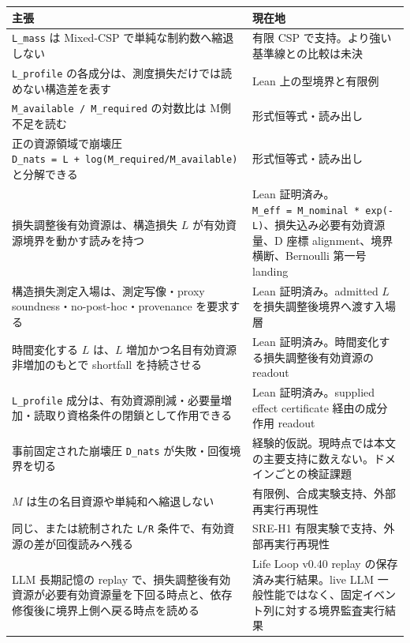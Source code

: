 \documentclass[12pt,a4paper]{article}
\begin{document}
{\def\LTcaptype{table} %
\begin{longtable}[]{@{}
  >{\raggedright\arraybackslash}p{}
  >{\raggedright\arraybackslash}p{}@{}}
\toprule\noalign{}
\begin{minipage}[b]{\linewidth}\raggedright
主張
\end{minipage} & \begin{minipage}[b]{\linewidth}\raggedright
現在地
\end{minipage} \\
\midrule\noalign{}
\endhead
\bottomrule\noalign{}
\endlastfoot
\texttt{L\_mass} は Mixed-CSP で単純な制約数へ縮退しない & 有限 CSP で支持。より強い基準線との比較は未決 \\
\texttt{L\_profile} の各成分は、測度損失だけでは読めない構造差を表す & Lean 上の型境界と有限例 \\
\texttt{M\_available\ /\ M\_required} の対数比は M側不足を読む & 形式恒等式・読み出し \\
正の資源領域で崩壊圧 \texttt{D\_nats\ =\ L\ +\ log(M\_required/M\_available)} と分解できる & 形式恒等式・読み出し \\
損失調整後有効資源は、構造損失 \(L\) が有効資源境界を動かす読みを持つ & Lean 証明済み。\texttt{M\_eff\ =\ M\_nominal\ *\ exp(-L)}、損失込み必要有効資源量、D 座標 alignment、境界横断、Bernoulli 第一号 landing \\
構造損失測定入場は、測定写像・proxy soundness・no-post-hoc・provenance を要求する & Lean 証明済み。admitted \(L\) を損失調整後境界へ渡す入場層 \\
時間変化する \(L\) は、\(L\) 増加かつ名目有効資源非増加のもとで shortfall を持続させる & Lean 証明済み。時間変化する損失調整後有効資源の readout \\
\texttt{L\_profile} 成分は、有効資源削減・必要量増加・読取り資格条件の閉鎖として作用できる & Lean 証明済み。supplied effect certificate 経由の成分作用 readout \\
事前固定された崩壊圧 \texttt{D\_nats} が失敗・回復境界を切る & 経験的仮説。現時点では本文の主要支持に数えない。ドメインごとの検証課題 \\
$M$ は生の名目資源や単純和へ縮退しない & 有限例、合成実験支持、外部再実行再現性 \\
同じ、または統制された \texttt{L/R} 条件で、有効資源の差が回復読みへ残る & SRE-H1 有限実験で支持、外部再実行再現性 \\
LLM 長期記憶の replay で、損失調整後有効資源が必要有効資源量を下回る時点と、依存修復後に境界上側へ戻る時点を読める & Life Loop v0.40 replay の保存済み実行結果。live LLM 一般性能ではなく、固定イベント列に対する境界監査実行結果 \\

\end{longtable}}
\end{document}
